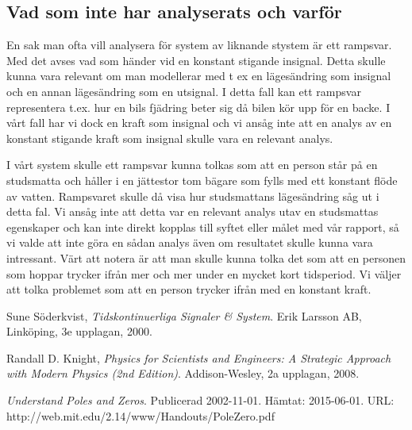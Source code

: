 \documentclass[10pt,a4paper]{article}
\begin{document}
\subsection{Vad som inte har analyserats och varför}

En sak man ofta vill analysera för system av liknande stystem är ett rampsvar. Med det avses vad som händer vid en konstant stigande insignal. Detta skulle kunna vara relevant om man modellerar med t ex en lägesändring som insignal och en annan lägesändring som en utsignal. I detta fall kan ett rampsvar representera t.ex. hur en bils fjädring beter sig då bilen kör upp för en backe. I vårt fall har vi dock en kraft som insignal och vi ansåg inte att en analys av en konstant stigande kraft som insignal skulle vara en relevant analys.

I vårt system skulle ett rampsvar kunna tolkas som att en person står på en studsmatta och håller i en jättestor tom bägare som fylls med ett konstant flöde av vatten. Rampsvaret skulle då visa hur studsmattans lägesändring såg ut i detta fal. Vi ansåg inte att detta var en relevant analys utav en studsmattas egenskaper och kan inte direkt kopplas till syftet eller målet med vår rapport, så vi valde att inte göra en sådan analys även om resultatet skulle kunna vara intressant. Värt att notera är att man skulle kunna tolka det som att en personen som hoppar trycker ifrån mer och mer under en mycket kort tidsperiod. Vi väljer att tolka problemet som att en person trycker ifrån med en konstant kraft.




\newpage

\begin{thebibliography}{9}

  Sune Söderkvist,
  \emph{Tidskontinuerliga Signaler \& System}.
  \newline
  Erik Larsson AB, Linköping,
  3e upplagan,
  2000.
  
	Randall D. Knight,
	\emph{Physics for Scientists and Engineers: A Strategic Approach with Modern Physics (2nd Edition)}.
	\newline
Addison-Wesley, 2a upplagan, 2008.


	\emph{Understand Poles and Zeros}.
	\newline
	Publicerad 2002-11-01. Hämtat: 2015-06-01.
	\newline
	URL: http://web.mit.edu/2.14/www/Handouts/PoleZero.pdf

\end{thebibliography}
\end{document}
